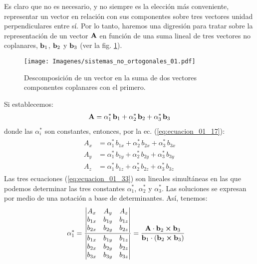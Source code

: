 \documentclass[12pt]{article}
\begin{document}
Es claro que no es necesario, y no siempre es la elección más conveniente, representar un vector en relación con sus componentes sobre tres vectores unidad perpendiculares entre sí. Por lo tanto, haremos una digresión para tratar sobre la representación de un vector $\vb{A}$ en función de una suma lineal de tres vectores no coplanares, $\vb{b}_{1}$, $\vb{b}_{2}$ y $\vb{b}_{3}$ (ver la fig. \ref{fig:figura_01_12}). 
\begin{figure}[H]
    \centering
    \texttt{[image: Imagenes/sistemas\_no\_ortogonales\_01.pdf]}
    \caption{Descomposición de un vector en la suma de dos vectores \\ \centering componentes coplanares con el primero.}
    \label{fig:figura_01_12}
\end{figure}
Si establecemos:
\begin{align}
    \vb{A} = \alpha_{1}^{*} \, \vb{b}_{1} + \alpha_{2}^{*} \, \vb{b}_{2} + \alpha_{3}^{*} \, \vb{b}_{3}
    \label{eq:ecuacion_01_32}
\end{align}
donde las $\alpha_{i}^{*}$ son constantes, entonces, por la ec. (\ref{eq:ecuacion_01_17}):
\begin{align}
\begin{aligned}
A_{x} &= \alpha_{1}^{*} \, b_{1x} + \alpha_{2}^{*} \, b_{2x} + \alpha_{3}^{*} \, b_{3x} \\[0.5em]
A_{y} &= \alpha_{1}^{*} \, b_{1y} + \alpha_{2}^{*} \, b_{2y} + \alpha_{3}^{*} \, b_{3y} \\[0.5em]
A_{z} &= \alpha_{1}^{*} \, b_{1z} + \alpha_{2}^{*} \, b_{2z} + \alpha_{3}^{*} \, b_{3z}
\end{aligned}
\label{eq:ecuacion_01_33}
\end{align}
Las tres ecuaciones (\ref{eq:ecuacion_01_33}) son lineales simultáneas en las que podemos determinar las tres constantes $\alpha_{1}^{*}$, $\alpha_{2}^{*}$ y $\alpha_{3}^{*}$. Las soluciones se expresan por medio de una notación a base de determinantes. Así, tenemos:
\begin{align}
\alpha_{1}^{*} &= \dfrac{\mdet{
    A_{x} & A_{y} & A_{z} \\
    b_{1x} & b_{1y} & b_{1z} \\
    b_{2x} & b_{2y} & b_{2z}}}{\mdet{
    b_{1x} & b_{1y} & b_{1z} \\
    b_{2x} & b_{2y} & b_{2z} \\
    b_{3x} & b_{3y} & b_{3z}}} =
    \dfrac{\vb{A} \cdot \vb{b}_{2} \cp \vb{b}_{3}}{\vb{b}_{1} \cdot \left( \vb{b}_{2} \cp \vb{b}_{3} \right)}
    \label{eq:ecuacion_01_34}
\end{align}
\end{document}
